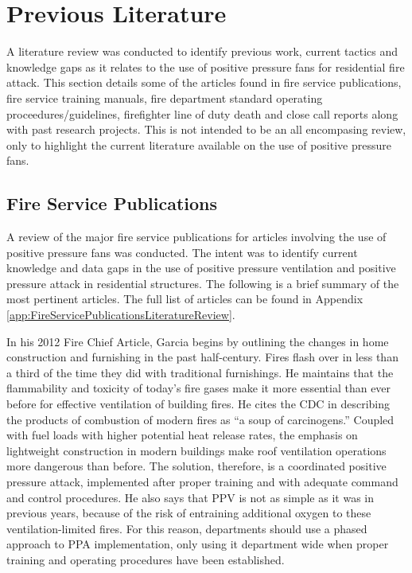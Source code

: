 \documentclass{article}
\begin{document}
\clearpage

\section{Previous Literature}
A literature review was conducted to identify previous work, current tactics and knowledge gaps as it relates to the use of positive pressure fans for residential fire attack. This section details some of the articles found in fire service publications, fire service training manuals, fire department standard operating proceedures/guidelines, firefighter line of duty death and close call reports along with past research projects. This is not intended to be an all encompasing review, only to highlight the current literature available on the use of positive pressure fans. 

\subsection{Fire Service Publications}
A review of the major fire service publications for articles involving the use of positive pressure fans was conducted. The intent was to identify current knowledge and data gaps in the use of positive pressure ventilation and positive pressure attack in residential structures. The following is a brief summary of the most pertinent articles. The full list of articles can be found in Appendix \ref{app:FireServicePublicationsLiteratureReview}. 

In his 2012 Fire Chief Article, Garcia begins by outlining the changes in home construction and furnishing in the past half-century. Fires flash over in less than a third of the time they did with traditional furnishings. He maintains that the flammability and toxicity of today’s fire gases make it more essential than ever before for effective ventilation of building fires. He cites the CDC in describing the products of combustion of modern fires as “a soup of carcinogens.” Coupled with fuel loads with higher potential heat release rates, the emphasis on lightweight construction in modern buildings make roof ventilation operations more dangerous than before. The solution, therefore, is a coordinated positive pressure attack, implemented after proper training and with adequate command and control procedures. He also says that PPV is not as simple as it was in previous years, because of the risk of entraining additional oxygen to these ventilation-limited fires. For this reason, departments should use a phased approach to PPA implementation, only using it department wide when proper training and operating procedures have been established.\cite{GarciaPPVatStructures}
\end{document}
